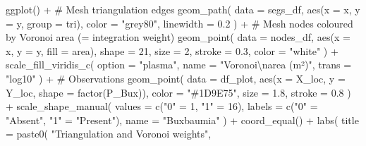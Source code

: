 \documentclass[
  letterpaper,
  DIV=11,
  numbers=noendperiod]{scrartcl}
\newenvironment{Shaded}{\begin{snugshade}}{\end{snugshade}}
\newcommand{\AttributeTok}[1]{\textcolor[rgb]{0.40,0.45,0.13}{#1}}
\newcommand{\CommentTok}[1]{\textcolor[rgb]{0.37,0.37,0.37}{#1}}
\newcommand{\DecValTok}[1]{\textcolor[rgb]{0.68,0.00,0.00}{#1}}
\newcommand{\FloatTok}[1]{\textcolor[rgb]{0.68,0.00,0.00}{#1}}
\newcommand{\FunctionTok}[1]{\textcolor[rgb]{0.28,0.35,0.67}{#1}}
\newcommand{\NormalTok}[1]{\textcolor[rgb]{0.00,0.23,0.31}{#1}}
\newcommand{\OtherTok}[1]{\textcolor[rgb]{0.00,0.23,0.31}{#1}}
\newcommand{\SpecialCharTok}[1]{\textcolor[rgb]{0.37,0.37,0.37}{#1}}
\newcommand{\StringTok}[1]{\textcolor[rgb]{0.13,0.47,0.30}{#1}}
\begin{document}
\begin{Shaded}
\begin{Highlighting}[]
    \FunctionTok{ggplot}\NormalTok{() }\SpecialCharTok{+}
      \CommentTok{\# Mesh triangulation edges}
      \FunctionTok{geom\_path}\NormalTok{(}
        \AttributeTok{data =}\NormalTok{ segs\_df, }\FunctionTok{aes}\NormalTok{(}\AttributeTok{x =}\NormalTok{ x, }\AttributeTok{y =}\NormalTok{ y, }\AttributeTok{group =}\NormalTok{ tri),}
        \AttributeTok{color =} \StringTok{"grey80"}\NormalTok{, }\AttributeTok{linewidth =} \FloatTok{0.2}
\NormalTok{      ) }\SpecialCharTok{+}
      \CommentTok{\# Mesh nodes coloured by Voronoi area (= integration weight)}
      \FunctionTok{geom\_point}\NormalTok{(}
        \AttributeTok{data =}\NormalTok{ nodes\_df, }\FunctionTok{aes}\NormalTok{(}\AttributeTok{x =}\NormalTok{ x, }\AttributeTok{y =}\NormalTok{ y, }\AttributeTok{fill =}\NormalTok{ area),}
        \AttributeTok{shape =} \DecValTok{21}\NormalTok{, }\AttributeTok{size =} \DecValTok{2}\NormalTok{, }\AttributeTok{stroke =} \FloatTok{0.3}\NormalTok{, }\AttributeTok{color =} \StringTok{"white"}
\NormalTok{      ) }\SpecialCharTok{+}
      \FunctionTok{scale\_fill\_viridis\_c}\NormalTok{(}
        \AttributeTok{option =} \StringTok{"plasma"}\NormalTok{, }\AttributeTok{name =} \StringTok{"Voronoi}\SpecialCharTok{\textbackslash{}n}\StringTok{area (m²)"}\NormalTok{,}
        \AttributeTok{trans =} \StringTok{"log10"}
\NormalTok{      ) }\SpecialCharTok{+}
      \CommentTok{\# Observations}
      \FunctionTok{geom\_point}\NormalTok{(}
        \AttributeTok{data =}\NormalTok{ df\_plot, }\FunctionTok{aes}\NormalTok{(}\AttributeTok{x =}\NormalTok{ X\_loc, }\AttributeTok{y =}\NormalTok{ Y\_loc, }\AttributeTok{shape =} \FunctionTok{factor}\NormalTok{(P\_Bux)),}
        \AttributeTok{color =} \StringTok{"\#1D9E75"}\NormalTok{, }\AttributeTok{size =} \FloatTok{1.8}\NormalTok{, }\AttributeTok{stroke =} \FloatTok{0.8}
\NormalTok{      ) }\SpecialCharTok{+}
      \FunctionTok{scale\_shape\_manual}\NormalTok{(}
        \AttributeTok{values =} \FunctionTok{c}\NormalTok{(}\StringTok{"0"} \OtherTok{=} \DecValTok{1}\NormalTok{, }\StringTok{"1"} \OtherTok{=} \DecValTok{16}\NormalTok{),}
        \AttributeTok{labels =} \FunctionTok{c}\NormalTok{(}\StringTok{"0"} \OtherTok{=} \StringTok{"Absent"}\NormalTok{, }\StringTok{"1"} \OtherTok{=} \StringTok{"Present"}\NormalTok{),}
        \AttributeTok{name =} \StringTok{"Buxbaumia"}
\NormalTok{      ) }\SpecialCharTok{+}
      \FunctionTok{coord\_equal}\NormalTok{() }\SpecialCharTok{+}
      \FunctionTok{labs}\NormalTok{(}
        \AttributeTok{title =} \FunctionTok{paste0}\NormalTok{(}
          \StringTok{"Triangulation and Voronoi weights"}\NormalTok{,}

\end{Highlighting}
\end{Shaded}
\end{document}
